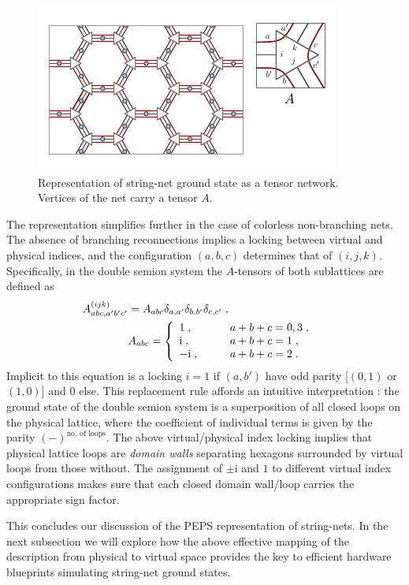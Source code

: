 \documentclass[twocolumn,floats,prx,showpacs]{revtex4-1}
\begin{document}
\begin{figure}
\includegraphics[width=1\columnwidth]{fig/ATensorDef.pdf}
\caption{Representation of string-net ground state as a tensor network. Vertices of the net carry a tensor $A$. }
\label{fig:ATensorDef}
\end{figure}

The representation simplifies further in the case of colorless non-branching nets. The absence of branching reconnections implies a locking between virtual and physical indices, and the configuration $(a,b,c)$ determines that of $(i,j,k)$. Specifically, in the double semion system the $A$-tensors of both sublattices are defined as \cite{Gu2009}
\begin{align}
\label{eq:ATensorLWS}
A^{(ijk)}_{abc,a'b'c'}&=A_{abc}\delta_{a,a'}\delta_{b,b'}\delta_{c,c'}\;,\cr
&A_{abc}=
\left\{\begin{array}{ll}
1\;,&\qquad a+b+c=0,3\;,\cr 
\mathrm i \;,&\qquad a+b+c=1\;,\cr 
-\mathrm i\;,&\qquad a+b+c=2\;.
\end{array}\right.
\end{align}
Implicit to this equation is a locking $i=1$ if $(a,b')$ have odd parity [$(0,1)$ or $(1,0)$] and $0$ else. This replacement rule affords an intuitive interpretation \cite{Gu2009}: the ground state of the double semion system is a superposition of all closed loops on the physical lattice, where the coefficient of individual terms is given by the parity $(-)^{\text{no. of loops}}$. The above virtual/physical index locking implies that physical lattice loops are \emph{domain walls} separating hexagons surrounded by virtual loops from those without. The assignment of $\pm \mathrm i$ and $1$ to different virtual index configurations makes sure that each closed domain wall/loop carries the appropriate sign factor.

This concludes our discussion of the PEPS representation of string-nets. In the next subsection we will explore how the above effective mapping of the description from physical to virtual space  provides the key to efficient hardware blueprints simulating string-net ground states.
\end{document}
